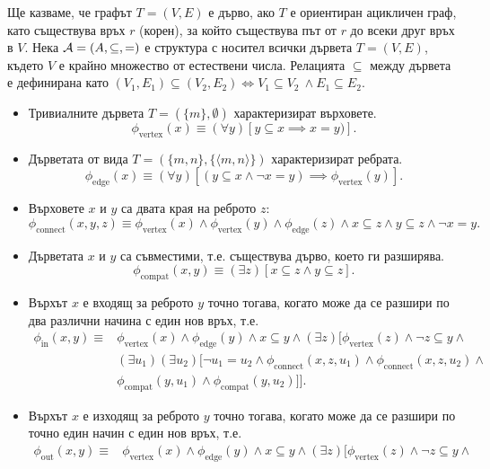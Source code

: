 \begin{problem}
  Ще казваме, че графът $T = (V,E)$ е дърво, ако $T$ е ориентиран ацикличен граф, като съществува връх $r$ (корен), за който
  съществува път от $r$ до всеки друг връх в $V$.
  Нека $\mathcal{A} = (A,\subseteq,=)$ е структура с носител всички дървета $T = (V,E)$, където $V$ е крайно множество от естествени числа.
  Релацията $\subseteq$ между дървета е дефинирана като $(V_1,E_1) \subseteq (V_2,E_2) \iff V_1 \subseteq V_2\ \land E_1 \subseteq E_2$.
  \begin{itemize}
  \item
    Тривиалните дървета $T = (\{m\},\emptyset)$ характеризират върховете. 
    \[\phi_{\text{vertex}}(x) \equiv (\forall y)[y \subseteq x \implies x = y)].\]
  \item
    Дърветата от вида $T = (\{m,n\}, \{\langle m,n \rangle\})$ характеризират ребрата.
    \[\phi_{\text{edge}}(x) \equiv (\forall y)[(y \subseteq x \land \neg x = y) \implies \phi_{\text{vertex}}(y)].\]
  \item
    Върховете $x$ и $y$ са двата края на реброто $z$:
    \[\phi_{\text{connect}}(x,y,z) \equiv \phi_{\text{vertex}}(x) \land \phi_{\text{vertex}}(y) \land \phi_{\text{edge}}(z) \land x \subseteq z \land y \subseteq z \land \neg x = y.\]
  \item
    Дърветата $x$ и $y$ са съвместими, т.е. съществува дърво, което ги разширява.
    \[\phi_{\text{compat}}(x,y) \equiv (\exists z)[x \subseteq z \land y \subseteq z].\]
  \item
    Върхът $x$ е входящ за реброто $y$ точно тогава, когато може да се разшири по два различни начина с един нов връх, т.е.
    \begin{align*}
      \phi_{\text{in}}(x,y) \equiv & \phi_{\text{vertex}}(x) \land \phi_{\text{edge}}(y) \land x \subseteq y \land (\exists z)[\phi_{\text{vertex}}(z) \land \neg z \subseteq y \land \\
                                & (\exists u_1)(\exists u_2)[\neg u_1 = u_2 \land \phi_{\text{connect}}(x,z,u_1) \land \phi_{\text{connect}}(x,z,u_2) \land \\
                                & \phi_{\text{compat}}(y,u_1) \land \phi_{\text{compat}}(y,u_2)]].
    \end{align*}
  \item
    Върхът $x$ е изходящ за реброто $y$ точно тогава, когато може да се разшири по точно един начин с един нов връх, т.е.
    \begin{align*}
      \phi_{\text{out}}(x,y) \equiv & \phi_{\text{vertex}}(x) \land \phi_{\text{edge}}(y) \land x \subseteq y \land (\exists z)[\phi_{\text{vertex}}(z) \land \neg z \subseteq y \land \\

\end{align*}
\end{itemize}
\end{problem}
